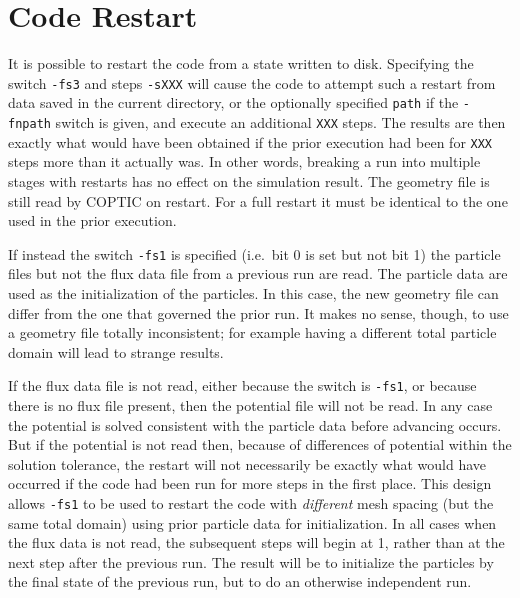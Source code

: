 \documentclass[12pt]{article}
\begin{document}
\section{Code Restart}

It is possible to restart the code from a state written to disk.
Specifying the switch \verb!-fs3! and steps \verb!-sXXX! will cause
the code to attempt such a restart from data saved in the current
directory, or the optionally specified \verb!path!  if the
\verb!-fnpath! switch is given, and execute an additional \verb!XXX!
steps.  The results are then exactly what would have been obtained if
the prior execution had been for \verb!XXX! steps more than it
actually was. In other words, breaking a run into multiple stages with
restarts has no effect on the simulation result. The geometry file is
still read by COPTIC on restart. For a full restart it must be
identical to the one used in the prior execution.


If instead the switch \verb!-fs1! is specified (i.e.\ bit 0 is set but
not bit 1) the particle files but not the flux data file from a previous
run are read. The particle data are used as the initialization of the
particles. In this case, the new geometry file can differ from the one
that governed the prior run. It makes no sense, though, to use a
geometry file totally inconsistent; for example having a different
total particle domain will lead to strange results.

If the flux data file is not read, either because the switch is
\verb!-fs1!, or because there is no flux file present, then the
potential file will not be read. In any case the potential is solved
consistent with the particle data before advancing occurs. But if the
potential is not read then, because of differences of potential
within the solution tolerance, the restart will not necessarily be exactly
what would have occurred if the code had been run for more steps in
the first place. This design allows \verb!-fs1! to be used to
restart the code with \emph{different} mesh spacing (but the same
total domain) using prior particle data for initialization.  In all
cases when the flux data is not read, the subsequent steps will begin
at 1, rather than at the next step after the previous run. The result
will be to initialize the particles by the final state of the
previous run, but to do an otherwise independent run.
\end{document}
